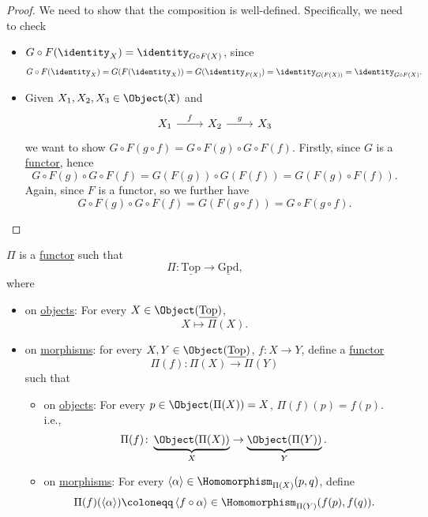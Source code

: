 \begin{proof}
	We need to show that the composition is well-defined. Specifically, we need to check
	\begin{itemize}
		\item \(G\circ F(\identity_{X}) = \identity_{G\circ F(X)}\), since
		      \[
			      G\circ F(\identity_{X} ) = G(F(\identity_{X} )) = G(\identity_{F(X)}) = \identity_{G(F(X))} = \identity_{G\circ F(X)}.
		      \]
		\item Given \(X_1, X_2, X_3\in \Object (\mathfrak{X})\) and
		      \[\begin{tikzcd}
				      {X_1} & {X_2} & {X_3}
				      \arrow["f", from=1-1, to=1-2]
				      \arrow["g", from=1-2, to=1-3]
			      \end{tikzcd}\]
		      we want to show \(G\circ F(g\circ f) = G\circ F(g) \circ G\circ F(f)\). Firstly, since \(G\) is a \hyperref[def:functor]{functor}, hence
		      \[
			      G\circ F(g) \circ G\circ F(f) = G(F(g))	\circ G(F(f)) = G\left(F(g)\circ F(f)\right).
		      \]
		      Again, since \(F\) is a functor, so we further have
		      \[
			      G\circ F(g) \circ G\circ F(f) = G(F(g\circ f)) = G\circ F(g\circ f).
		      \]
	\end{itemize}
\end{proof}
\begin{theorem}\label{thm:fundamental-groupoid-defines-a-functor}
	\(\Pi\) is a \hyperref[def:functor]{functor} such that
	\[
		\Pi\colon \underline{\mathrm{Top}} \to \underline{\mathrm{Gpd}},
	\]
	where
	\begin{itemize}
		\item on \hyperref[def:object]{objects}: For every \(X\in \Object (\underline{\mathrm{Top}})\),
		      \[
			      X\mapsto \Pi (X).
		      \]
		\item on \hyperref[def:morphism]{morphisms}: for every \(X, Y\in \Object (\underline{\mathrm{Top}})\), \(f\colon X\to Y\), define a \hyperref[def:functor]{functor}
		      \[
			      \Pi (f)\colon \Pi(X)\to \Pi (Y)
		      \]
		      such that
		      \begin{itemize}
			      \item on \hyperref[def:object]{objects}: For every \(p\in \Object (\Pi (X)) = X\), \(\Pi (f)(p) = f(p)\). i.e.,
			            \[
				            \Pi (f)\colon \underbrace{\Object (\Pi (X))}_{X}\to \underbrace{\Object (\Pi (Y))}_{Y}.
			            \]
			      \item on \hyperref[def:morphism]{morphisms}: For every \(\left< \alpha  \right> \in \Homomorphism _{\Pi (X)}(p, q)\), define
			            \[
				            \Pi (f)(\left< \alpha  \right> )\coloneqq \left< f\circ \alpha  \right> \in \Homomorphism _{\Pi (Y)}(f(p), f(q)).
			            \]
		      \end{itemize}
	\end{itemize}
\end{theorem}
